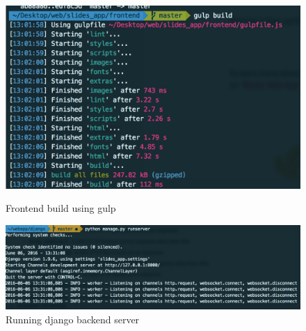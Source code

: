 \documentclass[11pt]{article}
\begin{document}
\begin{figure}[h]
\begin{minipage}{.5\textwidth}
  \centering
  \includegraphics[width=.6\linewidth]{gulp_build.png}
  \caption{Frontend build using gulp}
\end{minipage}%
\begin{minipage}{.5\textwidth}
  \centering
  \includegraphics[width=.6\linewidth]{django_build.png}
  \caption{Running django backend server}
\end{minipage}%
\end{figure}
\end{document}
